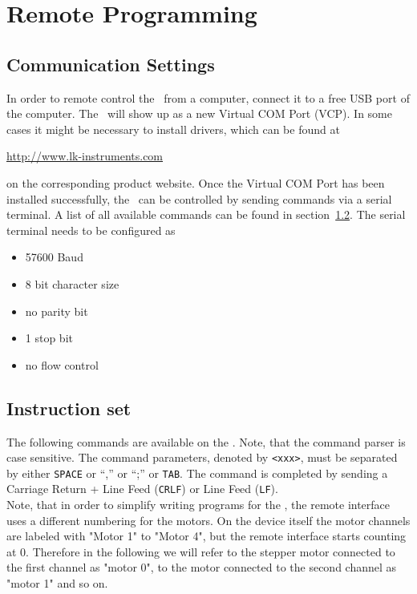 
\section{Remote Programming}
\label{chp:remote_programming}
\subsection{Communication Settings}
\label{chp:communication_settings}
In order to remote control the \productName ~from a computer, connect it to a free USB port of the computer. The \productName ~will show up as a new Virtual COM Port (VCP). In some cases it might be necessary to install drivers, which can be found at
\begin{center}
  \url{http://www.lk-instruments.com}
\end{center}
on the corresponding product website.
Once the Virtual COM Port has been installed successfully, the \productName ~can be controlled by sending commands via a serial terminal. A list of all available commands can be found in section~\ref{section_instruction_set}. The serial terminal needs to be configured as
\begin{itemize}
\item 57600 Baud
\item 8 bit character size
\item no parity bit
\item 1 stop bit
\item no flow control
\end{itemize}

\subsection{Instruction set}
\label{section_instruction_set}
The following commands are available on the \productName .
Note, that the command parser is case sensitive. The command
parameters, denoted by \texttt{<xxx>}, must be separated by
either \texttt{SPACE} or ``,'' or ``;'' or \texttt{TAB}. The
command is completed by sending a  Carriage Return + Line Feed
(\texttt{CRLF}) or Line Feed (\texttt{LF}).\\
Note, that in order to simplify writing programs for the \productName , the remote interface uses a different numbering for the motors. On the device itself the motor channels are labeled with "Motor 1" to "Motor 4", but the remote interface starts counting at 0. Therefore in the following we will refer to the stepper motor connected to the first channel as "motor 0", to the motor connected to the second channel as "motor 1" and so on.

